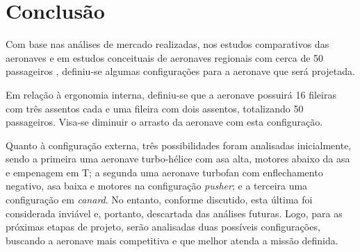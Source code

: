 \chapter{Conclusão}
\label{conclusao}

Com base nas análises de mercado realizadas, nos estudos comparativos das aeronaves e em estudos conceituais de aeronaves regionais com cerca de 50 passageiros , definiu-se algumas configurações para a aeronave que será projetada.

Em relação à ergonomia interna, definiu-se que a aeronave possuirá 16 fileiras com três assentos cada e uma fileira com dois assentos, totalizando 50 passageiros.
Visa-se diminuir o arrasto da aeronave com esta configuração.

Quanto à configuração externa, três possibilidades foram analisadas inicialmente, sendo a primeira uma aeronave turbo-hélice com asa alta, motores abaixo da asa e empenagem em T; a segunda uma aeronave turbofan com enflechamento negativo, asa baixa e motores na configuração \emph{pusher}; e a terceira uma configuração em \emph{canard}.
No entanto, conforme discutido, esta última foi considerada inviável e, portanto, descartada das análises futuras.
Logo, para as próximas etapas de projeto, serão analisadas duas possíveis configurações, buscando a aeronave mais competitiva e que melhor atenda a missão definida. 